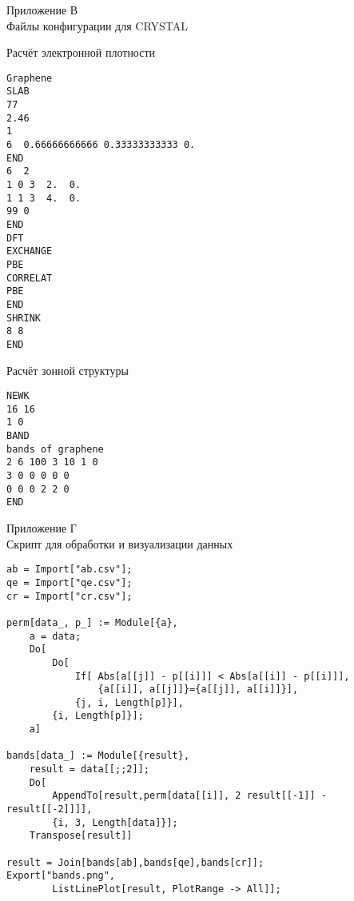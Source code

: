 \newpage
\begin{center}
    Приложение В\\
    Файлы конфигурации для CRYSTAL
\end{center}
Расчёт электронной плотности
\begin{Verbatim}[fontsize=\footnotesize]
Graphene
SLAB
77
2.46
1
6  0.66666666666 0.33333333333 0.
END
6  2
1 0 3  2.  0.
1 1 3  4.  0.
99 0
END
DFT
EXCHANGE
PBE
CORRELAT
PBE
END
SHRINK
8 8
END
\end{Verbatim}
\vspace{1cm}
Расчёт зонной структуры
\begin{Verbatim}[fontsize=\footnotesize]
NEWK
16 16
1 0
BAND
bands of graphene
2 6 100 3 10 1 0
3 0 0 0 0 0
0 0 0 2 2 0
END
\end{Verbatim}
\newpage
\begin{center}
    Приложение Г\\
    Скрипт для обработки и визуализации данных
\end{center}
\begin{Verbatim}[fontsize=\footnotesize]
ab = Import["ab.csv"];
qe = Import["qe.csv"];
cr = Import["cr.csv"];

perm[data_, p_] := Module[{a},
    a = data;
    Do[
        Do[
            If[ Abs[a[[j]] - p[[i]]] < Abs[a[[i]] - p[[i]]],
                {a[[i]], a[[j]]}={a[[j]], a[[i]]}],
            {j, i, Length[p]}],
        {i, Length[p]}];
    a]

bands[data_] := Module[{result},
    result = data[[;;2]];
    Do[
        AppendTo[result,perm[data[[i]], 2 result[[-1]] - result[[-2]]]],
        {i, 3, Length[data]}];
    Transpose[result]]

result = Join[bands[ab],bands[qe],bands[cr]];
Export["bands.png",
        ListLinePlot[result, PlotRange -> All]];
\end{Verbatim}